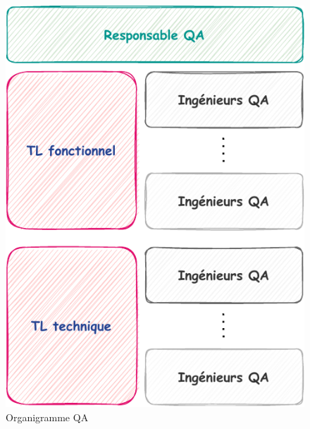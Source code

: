 \begin{figure}[H]
    \centering
        \includegraphics[width=0.52\linewidth]{images/sec3/organigrammeqa.pdf}
        \caption{Organigramme QA}
\end{figure}
